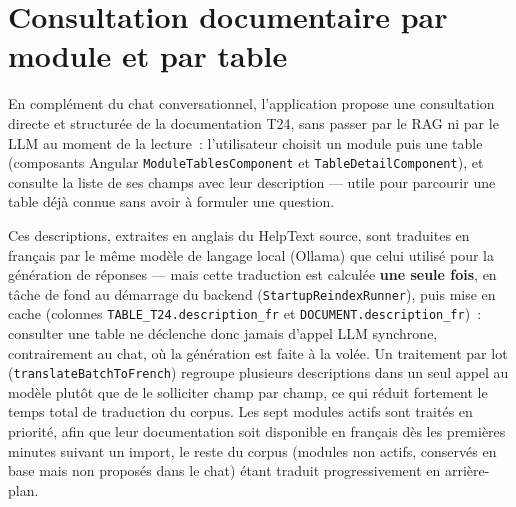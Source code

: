 ﻿\documentclass[12pt,a4paper]{report}
\newcommand{\code}[1]{\texttt{\color{biatbluedk}#1}}
\begin{document}
\section{Consultation documentaire par module et par table}
En complément du chat conversationnel, l'application propose une consultation directe et structurée de la documentation T24, sans passer par le RAG ni par le LLM au moment de la lecture~: l'utilisateur choisit un module puis une table (composants Angular \code{ModuleTablesComponent} et \code{TableDetailComponent}), et consulte la liste de ses champs avec leur description --- utile pour parcourir une table déjà connue sans avoir à formuler une question.

Ces descriptions, extraites en anglais du HelpText source, sont traduites en français par le même modèle de langage local (Ollama) que celui utilisé pour la génération de réponses --- mais cette traduction est calculée \textbf{une seule fois}, en tâche de fond au démarrage du backend (\code{StartupReindexRunner}), puis mise en cache (colonnes \code{TABLE\_T24.description\_fr} et \code{DOCUMENT.description\_fr})~: consulter une table ne déclenche donc jamais d'appel LLM synchrone, contrairement au chat, où la génération est faite à la volée. Un traitement par lot (\code{translateBatchToFrench}) regroupe plusieurs descriptions dans un seul appel au modèle plutôt que de le solliciter champ par champ, ce qui réduit fortement le temps total de traduction du corpus. Les sept modules actifs sont traités en priorité, afin que leur documentation soit disponible en français dès les premières minutes suivant un import, le reste du corpus (modules non actifs, conservés en base mais non proposés dans le chat) étant traduit progressivement en arrière-plan.
\end{document}
